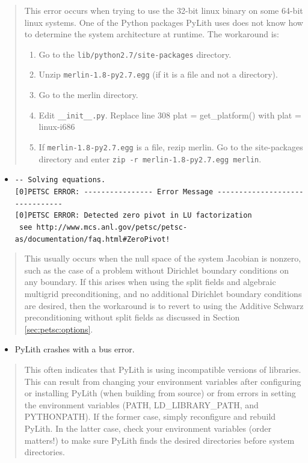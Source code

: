 \begin{quote}
This error occurs when trying to use the 32-bit linux binary on some
64-bit linux systems. One of the Python packages PyLith uses does
not know how to determine the system architecture at runtime. The
workaround is:
\begin{enumerate}
\item Go to the \texttt{lib/python2.7/site-packages} directory.
\item Unzip \texttt{merlin-1.8-py2.7.egg} (if it is a file and not a directory).
\item Go to the merlin directory.
\item Edit \texttt{\_\_init\_\_.py}. Replace line 308 plat = get\_platform()
with plat = \textquotedbl{}linux-i686\textquotedbl{}
\item If \texttt{merlin-1.8-py2.7.egg} is a file, rezip merlin. Go to the
site-packages directory and enter \textquotedbl{}\texttt{zip -r merlin-1.8-py2.7.egg
merlin}\textquotedbl{}.
\end{enumerate}
\end{quote}
\begin{itemize}
\item \texttt{-{}- Solving equations.} \\
\texttt{{[}0{]}PETSC ERROR: -{}-{}-{}-{}-{}-{}-{}-{}-{}-{}-{}-{}-{}-{}-{}-
Error Message -{}-{}-{}-{}-{}-{}-{}-{}-{}-{}-{}-{}-{}-{}-{}-{}-{}-{}-{}-{}-{}-{}-{}-{}-{}-{}-{}-{}-{}-{}-
} \\
\texttt{{[}0{]}PETSC ERROR: Detected zero pivot in LU factorization} \\
\texttt{ see http://www.mcs.anl.gov/petsc/petsc-as/documentation/faq.html\#ZeroPivot!}\end{itemize}
\begin{quote}
This usually occurs when the null space of the system Jacobian is
nonzero, such as the case of a problem without Dirichlet boundary
conditions on any boundary. If this arises when using the split fields
and algebraic multigrid preconditioning, and no additional Dirichlet
boundary conditions are desired, then the workaround is to revert
to using the Additive Schwarz preconditioning without split fields
as discussed in Section \vref{sec:petsc:options}. \end{quote}
\begin{itemize}
\item PyLith crashes with a bus error.\end{itemize}
\begin{quote}
This often indicates that PyLith is using incompatible versions of
libraries. This can result from changing your environment variables
after configuring or installing PyLith (when building from source)
or from errors in setting the environment variables (PATH, LD\_LIBRARY\_PATH,
and PYTHONPATH). If the former case, simply reconfigure and rebuild
PyLith. In the latter case, check your environment variables (order
matters!) to make sure PyLith finds the desired directories before
system directories. \end{quote}
